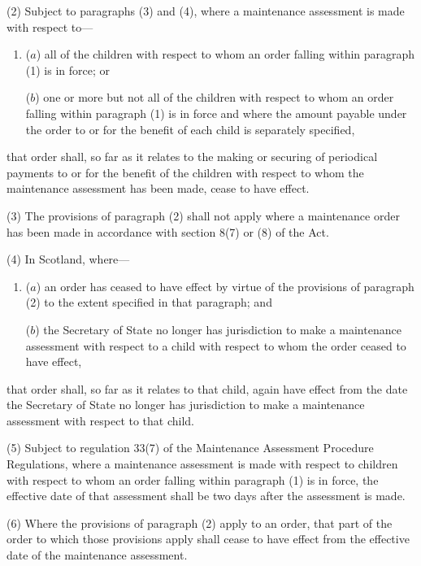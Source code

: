 \documentclass[12pt,a4paper]{article}
\begin{document}
(2) Subject to paragraphs (3) and (4), where a maintenance assessment is made with respect to—
\begin{enumerate}\item[]
($a$) all of the children with respect to whom an order falling within paragraph (1) is in force; or

($b$) one or more but not all of the children with respect to whom an order falling within paragraph (1) is in force and where the amount payable under the order to or for the benefit of each child is separately specified,
\end{enumerate}
that order shall, so far as it relates to the making or securing of periodical payments to or for the benefit of the children with respect to whom the maintenance assessment has been made, cease to have effect.  

(3) The provisions of paragraph (2) shall not apply where a maintenance order has been made in accordance with section 8(7) or (8) of the Act.

(4) In Scotland, where—
\begin{enumerate}\item[]
($a$) an order has ceased to have effect by virtue of the provisions of paragraph (2) to the extent specified in that paragraph; and

($b$) 
the Secretary of State  %
no longer has jurisdiction to make a maintenance assessment with respect to a child with respect to whom the order ceased to have effect,
\end{enumerate}
that order shall, so far as it relates to that child, again have effect from the date 
the Secretary of State  %
no longer has jurisdiction to make a maintenance assessment with respect to that child.

(5) 
Subject to regulation 33(7) of the Maintenance Assessment Procedure Regulations,  %
where a maintenance assessment is made with respect to children with respect to whom an order falling within paragraph (1) is in force, the effective date of that assessment shall be two days after the assessment is made.

(6) Where the provisions of paragraph (2) apply to an order, that part of the order to which those provisions apply shall cease to have effect from the effective date of the maintenance assessment.
\end{document}

